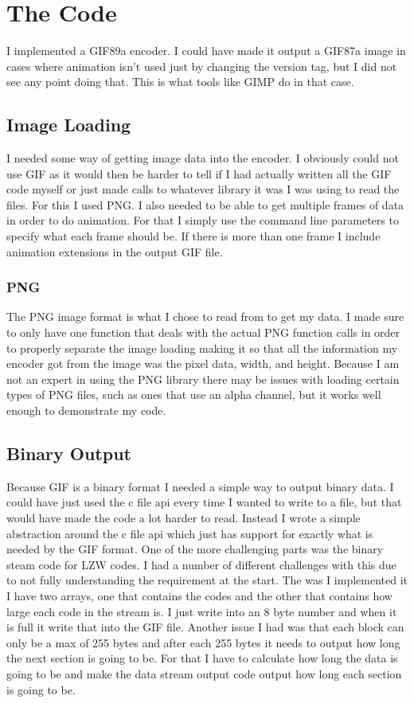 \documentclass[11pt]{article} %
\begin{document}
\section{The Code}
I implemented a GIF89a encoder. I could have made it output a GIF87a image in cases where animation isn't used just by changing the version tag, but I did not see any point doing that. This is what tools like GIMP do in that case. 
\subsection{Image Loading}
I needed some way of getting image data into the encoder. I obviously could not use GIF as it would then be harder to tell if I had actually written all the GIF code myself or just made calls to whatever library it was I was using to read the files. For this I used PNG.
I also needed to be able to get multiple frames of data in order to do animation. For that I simply use the command line parameters to specify what each frame should be. If there is more than one frame I include animation extensions in the output GIF file.
\subsubsection{PNG}
The PNG image format is what I chose to read from to get my data. I made sure to only have one function that deals with the actual PNG function calls in order to properly separate the image loading making it so that all the information my encoder got from the image was the pixel data, width, and height. Because I am not an expert in using the PNG library there may be issues with loading certain types of PNG files, such as ones that use an alpha channel, but it works well enough to demonstrate my code.
\subsection{Binary Output}
Because GIF is a binary format I needed a simple way to output binary data. I could have just used the c file api every time I wanted to write to a file, but that would have made the code a lot harder to read. Instead I wrote a simple abstraction around the c file api which just has support for exactly what is needed by the GIF format. One of the more challenging parts was the binary steam code for LZW codes. I had a number of different challenges with this due to not fully understanding the requirement at the start. The was I implemented it I have two arrays, one that contains the codes and the other that contains how large each code in the stream is. I just write into an 8 byte number and when it is full it write that into the GIF file. Another issue I had was that each block can only be a max of 255 bytes and after each 255 bytes it needs to output how long the next section is going to be. For that I have to calculate how long the data is going to be and make the data stream output code output how long each section is going to be.
\end{document}
